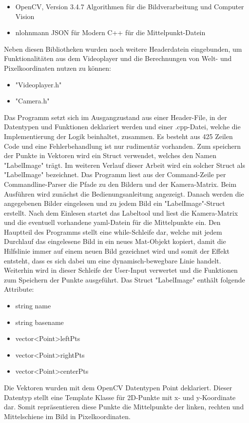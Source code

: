 \documentclass[11pt]{scrartcl}
\begin{document}
\begin{itemize}
	\item OpenCV, Version 3.4.7 Algorithmen für die Bildverarbeitung und Computer Vision
	\item nlohnmann JSON für Modern C++ für die Mittelpunkt-Datein
\end{itemize}
\noindent
Neben diesen Bibliotheken wurden noch weitere Headerdatein eingebunden, um Funktionalitäten aus dem Videoplayer und die Berechnungen von Welt- und Pixelkoordinaten nutzen zu können:

\begin{itemize}
	\item "Videoplayer.h"
	\item "Camera.h"
\end{itemize}

\noindent
Das Programm setzt sich im Ausgangzustand aus einer Header-File, in der Datentypen und Funktionen deklariert werden und einer .cpp-Datei, welche die Implementierung der Logik beinhaltet, zusammen. Es besteht aus 425 Zeilen Code und eine Fehlerbehandlung ist nur rudimentär vorhanden. Zum speichern der Punkte in Vektoren wird ein Struct verwendet, welches den Namen "LabelImage" trägt. Im weiteren Verlauf dieser Arbeit wird ein solcher Struct als "LabelImage" bezeichnet. Das Programm liest aus der Command-Zeile per Commandline-Parser die Pfade zu den Bildern und der Kamera-Matrix. Beim Ausführen wird zunächst die Bedienungsanleitung angezeigt. Danach werden die angegebenen Bilder eingelesen und zu jedem Bild ein "LabelImage"-Struct erstellt. Nach dem Einlesen startet das Labeltool und liest die Kamera-Matrix und die eventuell vorhandene yaml-Datein für die Mittelpunkte ein. Den Hauptteil des Programms stellt eine while-Schleife dar, welche mit jedem Durchlauf das eingelesene Bild in ein neues Mat-Objekt kopiert, damit die Hilfslinie immer auf einem neuen Bild gezeichnet wird und somit der Effekt entsteht, dass es sich dabei um eine dynamisch-bewegbare Linie handelt. Weiterhin wird in dieser Schleife der User-Input verwertet und die Funktionen zum Speichern der Punkte ausgeführt. Das Struct "LabelImage" enthält folgende Attribute:
\begin{itemize}
	\item string name
	\item string basename
	\item vector\textless Point\textgreater leftPts
	\item vector\textless Point\textgreater rightPts
	\item vector\textless Point\textgreater centerPts
\end{itemize}
\noindent
Die Vektoren wurden mit dem OpenCV Datentypen Point deklariert. Dieser Datentyp stellt eine Template Klasse für 2D-Punkte mit x- und y-Koordinate dar. Somit repräsentieren diese Punkte die Mittelpunkte der linken, rechten und Mittelschiene im Bild in Pixelkoordinaten.
\\
\end{document}
